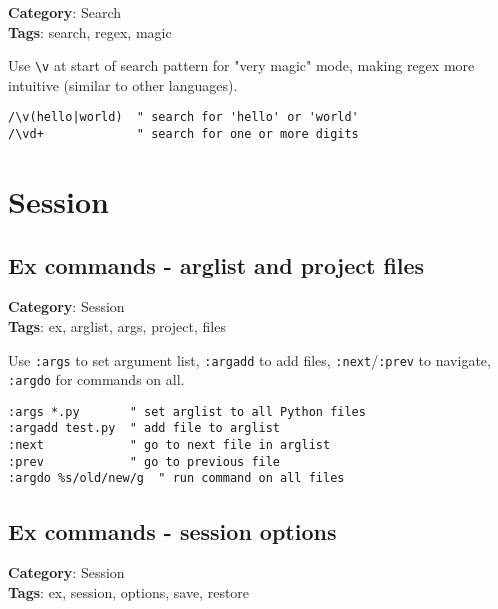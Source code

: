{{{{{{{{{{{{{{\textbf{Category}: Search\\ \textbf{Tags}: search, regex, magic
\vspace{0.5cm}

Use {\footnotesize \Verb§\v§} at start of search pattern for "very magic" mode, making regex more intuitive (similar to other languages).

\begin{Exa*}{}
\begin{Verbatim}[fontsize=\footnotesize, breaklines, breakanywhere]
/\v(hello|world)  " search for 'hello' or 'world'
/\vd+             " search for one or more digits
\end{Verbatim}
\end{Exa*}

\chapter{Session}
\section{Ex commands - arglist and project files}

\textbf{Category}: Session\\ \textbf{Tags}: ex, arglist, args, project, files
\vspace{0.5cm}

Use {\footnotesize \Verb§:args§} to set argument list, {\footnotesize \Verb§:argadd§} to add files, {\footnotesize \Verb§:next§}/{\footnotesize \Verb§:prev§} to navigate, {\footnotesize \Verb§:argdo§} for commands on all.

\begin{Exa*}{}
\begin{Verbatim}[fontsize=\footnotesize, breaklines, breakanywhere]
:args *.py       " set arglist to all Python files
:argadd test.py  " add file to arglist
:next            " go to next file in arglist
:prev            " go to previous file
:argdo %s/old/new/g  " run command on all files
\end{Verbatim}
\end{Exa*}

\section{Ex commands - session options}

\textbf{Category}: Session\\ \textbf{Tags}: ex, session, options, save, restore
\vspace{0.5cm}

}}}}}}}}}}}}}}
